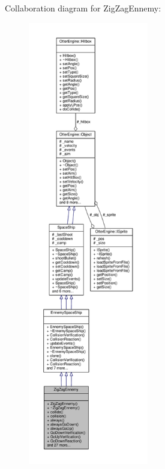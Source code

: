 Collaboration diagram for Zig\+Zag\+Ennemy\+:\nopagebreak
\begin{figure}[H]
\begin{center}
\leavevmode
\includegraphics[height=550pt]{d7/d5f/class_zig_zag_ennemy__coll__graph}
\end{center}
\end{figure}
